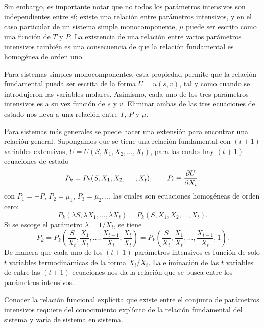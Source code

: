 Sin embargo, es importante notar que no todos los parámetros intensivos son independientes entre sí;
existe una relación entre parámetros intensivos, y en el caso particular de un sistema simple
monocomponente, $\mu$ puede ser escrito como una función de $T$ y $P$. La existencia de una
relación entre varios parámetros intensivos también es una consecuencia de que la relación
fundamental es homogénea de orden uno.

\begin{observacion}
  Para sistemas simples monocomponentes, esta propiedad permite que la relación fundamental pueda
  ser escrita de la forma $U=u(s,v)$, tal y como cuando se introdujeron las variables molares.
  Asimismo, cada uno de los tres parámetros intensivos es a su vez función de $s$ y $v$. Eliminar
  ambas de las tres ecuaciones de estado nos lleva a una relación entre $T$, $P$ y $\mu$.
\end{observacion}

Para sistemas más generales se puede hacer una extensión para encontrar una relación general.
Supongamos que se tiene una relación fundamental con $(t+1)$ variables extensivas,
$U=U(S,X_1,X_2,\dots,X_t)$, para las cuales hay $(t+1)$ ecuaciones de estado
\begin{equation*}
  P_k=P_k(S,X_1,X_2,\dots,X_t),\qquad P_i\equiv\pdv{U}{X_i},
\end{equation*}
con $P_1=-P$, $P_2=\mu_1$, $P_3=\mu_2,\dots$
las cuales son ecuaciones homogéneas de orden cero:
\begin{equation*}
  P_k(\lambda S,\lambda X_1,\dots,\lambda X_t)=P_k(S,X_1,X_2,\dots,X_t).
\end{equation*}
Si se escoge el parámetro $\lambda=1/X_t$, se tiene
\begin{equation*}
  P_k=P_k\!\left(\frac{S}{X_t},\frac{X_1}{X_t},\dots,\frac{X_{t-1}}{X_t},\frac{X_t}{X_t}\right)
  =P_k\!\left(\frac{S}{X_t},\frac{X_1}{X_t},\dots,\frac{X_{t-1}}{X_t},1\right).
\end{equation*}
De manera que cada uno de los $(t+1)$ parámetros intensivos es función de solo $t$ variables
termodinámicas de la forma $X_i/X_t$. La eliminación de las $t$ variables de entre las
$(t+1)$ ecuaciones nos da la relación que se busca entre los parámetros intensivos.

Conocer la relación funcional explícita que existe entre el conjunto de parámetros intensivos
requiere del conocimiento explícito de la relación fundamental del sistema y varía de sistema en
sistema.

